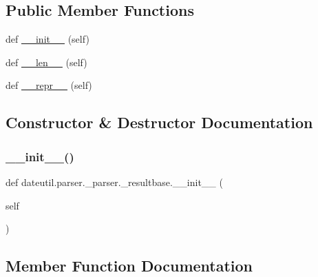 \subsection*{Public Member Functions}
\begin{DoxyCompactItemize}
\item 
def \hyperlink{classdateutil_1_1parser_1_1__parser_1_1__resultbase_a4f225fbda4f68443e0a8b21800e1d652}{\+\_\+\+\_\+init\+\_\+\+\_\+} (self)
\item 
def \hyperlink{classdateutil_1_1parser_1_1__parser_1_1__resultbase_a4f4861d0d389807cbcdba08bd6804333}{\+\_\+\+\_\+len\+\_\+\+\_\+} (self)
\item 
def \hyperlink{classdateutil_1_1parser_1_1__parser_1_1__resultbase_a95faf3e3b6dcd3439394cabd3db22d03}{\+\_\+\+\_\+repr\+\_\+\+\_\+} (self)
\end{DoxyCompactItemize}


\subsection{Constructor \& Destructor Documentation}
\mbox{\label{classdateutil_1_1parser_1_1__parser_1_1__resultbase_a4f225fbda4f68443e0a8b21800e1d652}} 
\subsubsection{\texorpdfstring{\+\_\+\+\_\+init\+\_\+\+\_\+()}{\_\_init\_\_()}}
{\footnotesize\ttfamily def dateutil.\+parser.\+\_\+parser.\+\_\+resultbase.\+\_\+\+\_\+init\+\_\+\+\_\+ (\begin{DoxyParamCaption}\item[{}]{self }\end{DoxyParamCaption})}



\subsection{Member Function Documentation}
\mbox{\label{classdateutil_1_1parser_1_1__parser_1_1__resultbase_a4f4861d0d389807cbcdba08bd6804333}} 
